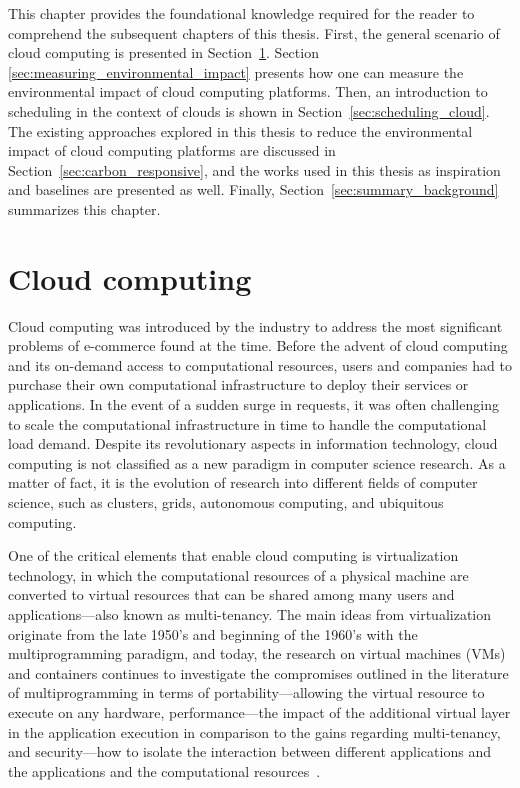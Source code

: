 This chapter provides the foundational knowledge required for the reader to comprehend the subsequent chapters of this thesis. First, the general scenario of cloud computing is presented in Section~\ref{sec:cloud}. Section \ref{sec:measuring_environmental_impact} presents how one can measure the environmental impact of cloud computing platforms. Then, an introduction to scheduling in the context of clouds is shown in Section~\ref{sec:scheduling_cloud}.  The existing approaches explored in this thesis to reduce the environmental impact of cloud computing platforms are discussed in Section~\ref{sec:carbon_responsive}, and the works used in this thesis as inspiration and baselines are presented as well. Finally,  Section~\ref{sec:summary_background} summarizes this chapter.
\section{Cloud computing}

\label{sec:cloud}

Cloud computing was introduced by the industry to address the most significant problems of e-commerce found at the time. Before the advent of cloud computing and its on-demand access to computational resources, users and companies had to purchase their own computational infrastructure to deploy their services or applications. In the event of a sudden surge in requests, it was often challenging to scale the computational infrastructure in time to handle the computational load demand. Despite its revolutionary aspects in information technology, cloud computing is not classified as a new paradigm in computer science research. As a matter of fact, it is the evolution of research into different fields of computer science, such as clusters, grids, autonomous computing, and ubiquitous computing.


One of the critical elements that enable cloud computing is virtualization technology, in which the computational resources of a physical machine are converted to virtual resources that can be shared among many users and applications---also known as multi-tenancy.  The main ideas from virtualization originate from the late 1950's and beginning of the 1960's with the multiprogramming paradigm, and today, the research on virtual machines (VMs) and containers continues to investigate the compromises outlined in the literature of multiprogramming in terms of portability---allowing the virtual resource to execute on any hardware,  performance---the impact of the additional virtual layer in the application execution in comparison to the gains regarding multi-tenancy, and security---how to isolate the interaction between different applications and the applications and the computational resources~\cite{randall2020_virtualization}.


